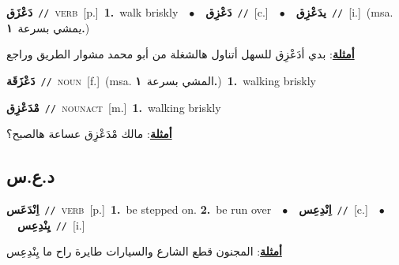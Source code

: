 \documentclass[10pt,a4paper,twoside]{article} %
\begin{document}
\begin{multicols}{2}
{\setlength\topsep{0pt}\textbf{\foreignlanguage{arabic}{دَعْزَق}}\ {\color{gray}\texttt{//}\color{black}}\ \textsc{verb}\ [p.]\ \textbf{1.}~walk briskly\ \ $\bullet$\ \ \setlength\topsep{0pt}\textbf{\foreignlanguage{arabic}{دَعْزِق}}\ {\color{gray}\texttt{//}\color{black}}\ [c.]\ \ $\bullet$\ \ \setlength\topsep{0pt}\textbf{\foreignlanguage{arabic}{يدَعْزِق}}\ {\color{gray}\texttt{//}\color{black}}\ [i.]\ \color{gray}(msa. \foreignlanguage{arabic}{يمشي بسرعة}~\foreignlanguage{arabic}{\textbf{١.}})\color{black}\  \begin{flushright}\color{gray}\foreignlanguage{arabic}{\textbf{\underline{\foreignlanguage{arabic}{أمثلة}}}: بدي أدَعْزِق للسهل أتناول هالشغلة من أبو محمد مشوار الطريق وراجع}\end{flushright}\color{black}} \vspace{2mm}

{\setlength\topsep{0pt}\textbf{\foreignlanguage{arabic}{دَعْزَقَة}}\ {\color{gray}\texttt{//}\color{black}}\ \textsc{noun}\ [f.]\ \color{gray}(msa. \foreignlanguage{arabic}{المشي بسرعة}~\foreignlanguage{arabic}{\textbf{١.}})\color{black}\ \textbf{1.}~walking briskly\ } \vspace{2mm}

{\setlength\topsep{0pt}\textbf{\foreignlanguage{arabic}{مْدَعْزِق}}\ {\color{gray}\texttt{//}\color{black}}\ \textsc{noun\textunderscore act}\ [m.]\ \textbf{1.}~walking briskly\  \begin{flushright}\color{gray}\foreignlanguage{arabic}{\textbf{\underline{\foreignlanguage{arabic}{أمثلة}}}: مالك مْدَعْزِق عساعة هالصبح؟}\end{flushright}\color{black}} \vspace{2mm}

\vspace{-3mm}
\subsection*{\color{blue}\foreignlanguage{arabic}{د.ع.س}\color{blue}{}} 

{\setlength\topsep{0pt}\textbf{\foreignlanguage{arabic}{اِنْدَعَس}}\ {\color{gray}\texttt{//}\color{black}}\ \textsc{verb}\ [p.]\ \textbf{1.}~be stepped on.  \textbf{2.}~be run over\ \ $\bullet$\ \ \setlength\topsep{0pt}\textbf{\foreignlanguage{arabic}{اِنْدِعِس}}\ {\color{gray}\texttt{//}\color{black}}\ [c.]\ \ $\bullet$\ \ \setlength\topsep{0pt}\textbf{\foreignlanguage{arabic}{يِنْدِعِس}}\ {\color{gray}\texttt{//}\color{black}}\ [i.]\  \begin{flushright}\color{gray}\foreignlanguage{arabic}{\textbf{\underline{\foreignlanguage{arabic}{أمثلة}}}: المجنون قطع الشارع والسيارات طايرة راح ما يِنْدِعِس}\end{flushright}\color{black}} \vspace{2mm}


\end{multicols}
\end{document}
